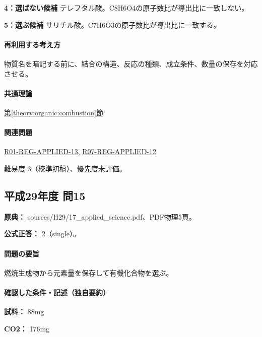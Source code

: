 \noindent\textbf{4：選ばない候補} テレフタル酸。C8H6O4の原子数比が導出比に一致しない。\par

\noindent\textbf{5：選ぶ候補} サリチル酸。C7H6O3の原子数比が導出比に一致する。\par

\paragraph{再利用する考え方} 物質名を暗記する前に、結合の構造、反応の種類、成立条件、数量の保存を対応させる。

\paragraph{共通理論} \hyperref[theory:organic:combustion]{第\ref*{theory:organic:combustion}節}

\paragraph{関連問題} \hyperref[q:r01-reg-applied-13]{R01-REG-APPLIED-13}, \hyperref[q:r07-reg-applied-12]{R07-REG-APPLIED-12}

\par 難易度 3（校準初稿）、優先度未評価。

\subsection{平成29年度 問15}
\label{q:h29-reg-applied-15}

\noindent\textbf{原典：} sources/H29/17\_applied\_science.pdf、PDF物理5頁。

\textbf{公式正答：} 2（single）。

\paragraph{問題の要旨} 燃焼生成物から元素量を保存して有機化合物を選ぶ。

\paragraph{確認した条件・記述（独自要約）}\mbox{}\par

\noindent\textbf{試料：} 88mg\par

\noindent\textbf{CO2：} 176mg\par

